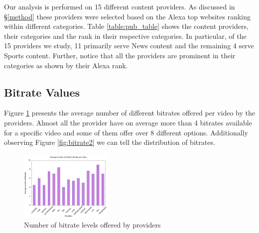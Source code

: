 \documentclass[]{sig-alternate-10pt}
\begin{document}
Our analysis is performed on 15 different content providers. As
discussed in \S\ref{method} these providers were selected based on the
Alexa top websites ranking within different categories. Table
\ref{table:pub_table} shows the content providers, their categories and
the rank in their respective categories. In particular, of the 15
providers we study, 11 primarily serve News content and the remaining 4
serve Sports content. Further, notice that all the providers are
prominent in their categories as shown by their Alexa rank. 

\hypertarget{bitrate-values}{%
\subsection{Bitrate Values}\label{bitrate-values}}

Figure \ref{fig:bitrate1} presents the average number of different
bitrates offered per video by the providers. Almost all the provider
have on average more than 4 bitrates available for a specific video and
some of them offer over 8 different options. Additionally observing
Figure \ref{fig:bitrate2} we can tell the distribution of bitrates.

\begin{figure}
\centering
\includegraphics[width=0.4\textwidth]{bitrate_bar_plot.jpg}
\caption{Number of bitrate levels offered by providers}
\label{fig:bitrate1}
\end{figure}
\end{document}
